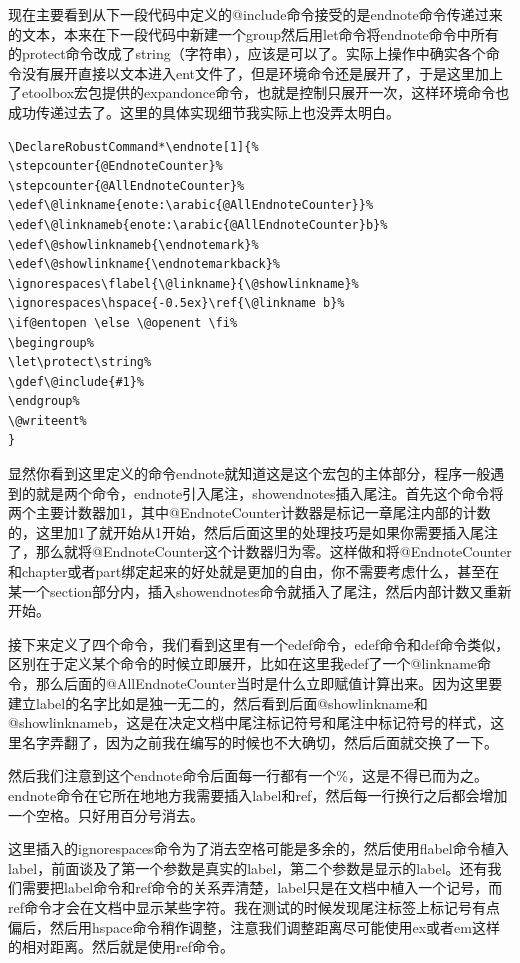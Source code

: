 \documentclass[11pt,oneside]{book}
\begin{document}
现在主要看到从下一段代码中定义的@include命令接受的是endnote命令传递过来的文本，本来在下一段代码中新建一个group然后用let命令将endnote命令中所有的protect命令改成了string（字符串），应该是可以了。实际上操作中确实各个命令没有展开直接以文本进入ent文件了，但是环境命令还是展开了，于是这里加上了etoolbox宏包提供的expandonce命令，也就是控制只展开一次，这样环境命令也成功传递过去了。这里的具体实现细节我实际上也没弄太明白。

\begin{Verbatim}
\DeclareRobustCommand*\endnote[1]{%
\stepcounter{@EndnoteCounter}%
\stepcounter{@AllEndnoteCounter}%
\edef\@linkname{enote:\arabic{@AllEndnoteCounter}}%
\edef\@linknameb{enote:\arabic{@AllEndnoteCounter}b}%
\edef\@showlinknameb{\endnotemark}%
\edef\@showlinkname{\endnotemarkback}%
\ignorespaces\flabel{\@linkname}{\@showlinkname}%
\ignorespaces\hspace{-0.5ex}\ref{\@linkname b}%
\if@entopen \else \@openent \fi%
\begingroup%
\let\protect\string%
\gdef\@include{#1}%
\endgroup%
\@writeent%
}
\end{Verbatim}
显然你看到这里定义的命令endnote就知道这是这个宏包的主体部分，程序一般遇到的就是两个命令，endnote引入尾注，showendnotes插入尾注。首先这个命令将两个主要计数器加1，其中@EndnoteCounter计数器是标记一章尾注内部的计数的，这里加1了就开始从1开始，然后后面这里的处理技巧是如果你需要插入尾注了，那么就将@EndnoteCounter这个计数器归为零。这样做和将@EndnoteCounter和chapter或者part绑定起来的好处就是更加的自由，你不需要考虑什么，甚至在某一个section部分内，插入showendnotes命令就插入了尾注，然后内部计数又重新开始。

接下来定义了四个命令，我们看到这里有一个edef命令，edef命令和def命令类似，区别在于定义某个命令的时候立即展开，比如在这里我edef了一个@linkname命令，那么后面的@AllEndnoteCounter当时是什么立即赋值计算出来。因为这里要建立label的名字比如是独一无二的，然后看到后面@showlinkname和@showlinknameb，这是在决定文档中尾注标记符号和尾注中标记符号的样式，这里名字弄翻了，因为之前我在编写的时候也不大确切，然后后面就交换了一下。

然后我们注意到这个endnote命令后面每一行都有一个\%，这是不得已而为之。endnote命令在它所在地地方我需要插入label和ref，然后每一行换行之后都会增加一个空格。只好用百分号消去。

这里插入的ignorespaces命令为了消去空格可能是多余的，然后使用flabel命令植入label，前面谈及了第一个参数是真实的label，第二个参数是显示的label。还有我们需要把label命令和ref命令的关系弄清楚，label只是在文档中植入一个记号，而ref命令才会在文档中显示某些字符。我在测试的时候发现尾注标签上标记号有点偏后，然后用hspace命令稍作调整，注意我们调整距离尽可能使用ex或者em这样的相对距离。然后就是使用ref命令。
\end{document}
